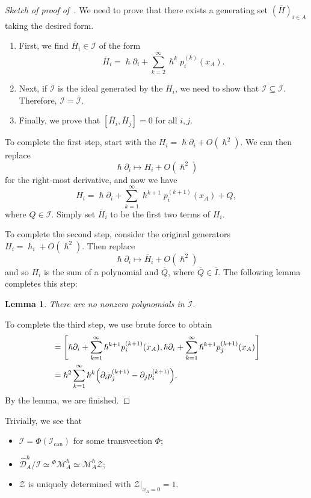 \documentclass{amsart}
\newtheorem{lem}[thm]{Lemma}
\theoremstyle{definition}
\theoremstyle{remark}
\theoremstyle{plain}
\theoremstyle{definition}
\theoremstyle{remark}
\newcommand{\mc}[1]{\mathcal{#1}}
\newcommand{\mr}[1]{\mathrm{#1}}
\newcommand{\ol}[1]{\overline{#1}}
\newcommand{\wh}[1]{\widehat{#1}}
\newcommand{\1}{\mathbf{1}}
\newcommand{\2}{\mathbf{2}}
\newcommand{\3}{\mathbf{3}}
\begin{document}
\begin{proof}[Sketch of proof of~]
    We need to prove that there exists a generating set $(\ol{H})_{i \in A}$ taking the desired form.
    \begin{enumerate}
        \item First, we find $\ol{H}_i \in \mc{I}$ of the form
            \[ \ol{H}_i = \hslash \partial_i + \sum_{k=2}^{\infty} \hslash^k p_i^{(k)}(x_A). \]
        \item Next, if $\ol{\mc{I}}$ is the ideal generated by the $\ol{H}_i$, we need to show that $\mc{I} \subseteq \ol{\mc{I}}$. Therefore, $\mc{I} = \ol{\mc{I}}$.
        \item Finally, we prove that $[\ol{H}_i, \ol{H}_j] = 0$ for all $i, j$.
    \end{enumerate}

    To complete the first step, start with the $H_i = \hslash \partial_i + O(\hslash^2)$. We can then replace
    \[ \hslash \partial_i \mapsto H_i + O(\hslash^2) \]
    for the right-most derivative, and now we have
    \[ H_i = \hslash \partial_i + \sum_{k=1}^{\infty} \hslash^{k+1} p_i^{(k+1)}(x_A) + Q, \]
    where $Q \in \mc{I}$. Simply set $\ol{H}_i$ to be the first two terms of $H_i$.

    To complete the second step, consider the original generators $H_i = \hslash_i + O(\hslash^2)$. Then replace
    \[ \hslash \partial_i \mapsto \ol{H}_i + O(\hslash^2) \]
    and so $H_i$ is the sum of a polynomial and $\ol{Q}$, where $\ol{Q} \in \ol{I}$. The following lemma completes this step:
    \begin{lem}
        There are no nonzero polynomials in $\mc{I}$.
    \end{lem}
    
    To complete the third step, we use brute force to obtain
    \begin{align*}
        [\ol{H}_i, \ol{H}_j] &= \qty[\hslash \partial_i + \sum_{k=1}^{\infty} \hslash^{k+1} p_i^{(k+1)}(x_A), \hslash \partial_i + \sum_{k=1}^{\infty} \hslash^{k+1} p_j^{(k+1)}(x_A)] \\
        &= \hslash^2 \sum_{k=1}^{\infty} \hslash^k \qty(\partial_i p_j^{(k+1)} - \partial_j p_i^{(k+1)}).
    \end{align*}
    By the lemma, we are finished.
\end{proof}

Trivially, we see that
\begin{itemize}
    \item $\mc{I} = \Phi(\mc{I}_{\mr{can}})$ for some transvection $\Phi$;
    \item $\wh{\mc{D}}_A^{\hslash} / \mc{I} \simeq {}^{\Phi}\mc{M}_A^{\hslash} \simeq \mc{M}_A^{\hslash} \mc{Z}$;
    \item $\mc{Z}$ is uniquely determined with $\mc{Z} |_{x_A = 0} = 1$.
\end{itemize}
\end{document}
